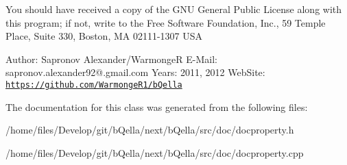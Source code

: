 You should have received a copy of the GNU General Public License along with this program; if not, write to the Free Software Foundation, Inc., 59 Temple Place, Suite 330, Boston, MA 02111-\/1307 USA

Author: Sapronov Alexander/WarmongeR E-\/Mail: sapronov.alexander92@.gmail.com Years: 2011, 2012 WebSite: \href{https://github.com/WarmongeR1/bQella}{\tt https://github.com/WarmongeR1/bQella} 

The documentation for this class was generated from the following files:\begin{DoxyCompactItemize}
\item 
/home/files/Develop/git/bQella/next/bQella/src/doc/docproperty.h\item 
/home/files/Develop/git/bQella/next/bQella/src/doc/docproperty.cpp\end{DoxyCompactItemize}
